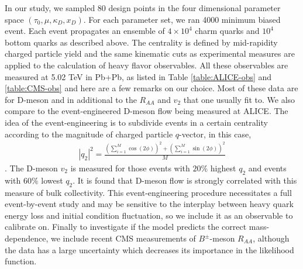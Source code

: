 \documentclass[aps, prc, reprint, amsmath, groupedaddress, nofootinbib]{revtex4-1}
\begin{document}
In our study, we sampled 80 design points in the four dimensional parameter space $(\tau_0, \mu, \kappa_D, x_D)$.
For each parameter set, we ran 4000 minimum biased event.
Each event propagates an ensemble of $4\times 10^4$ charm quarks and $10^4$ bottom quarks as described above.
The centrality is defined by mid-rapidity charged particle yield and the same kinematic cuts as experimental measures are applied to the calculation of heavy flavor observables.
All these observables are measured at 5.02 TeV in Pb+Pb, as listed in Table \ref{table:ALICE-obs} and \ref{table:CMS-obs} and here are a few remarks on our choice.
Most of these data are for D-meson and in additional to the $R_{AA}$ and $v_2$ that one usually fit to. 
We also compare to the event-engineered D-meson flow being measured at ALICE.
The idea of the event-engineering is to subdivide events in a certain centrality according to the magnitude of charged particle $q$-vector, in this case,
\begin{eqnarray}
|q_2|^2 = \frac{\left(\sum_{i=1}^{M} \cos(2\phi) \right)^2+ \left(\sum_{i=1}^{M} \sin(2\phi) \right)^2}{M}
\end{eqnarray}.
The D-meson $v_2$ is measured for those events with $20\%$ highest $q_2$ and events with $60\%$ lowest $q_2$.
It is found that D-meson flow is strongly correlated with this measure of bulk collectivity.
This event-engineering procedure necessitates a full event-by-event study and may be sensitive to the interplay between heavy quark energy loss and initial condition fluctuation, so we include it as an observable to calibrate on.
Finally to investigate if the model predicts the correct mass-dependence, we include recent CMS measurements of $B^{\pm}$-meson $R_{AA}$, although the data has a large uncertainty which decreases its importance in the likelihood function.
\end{document}
